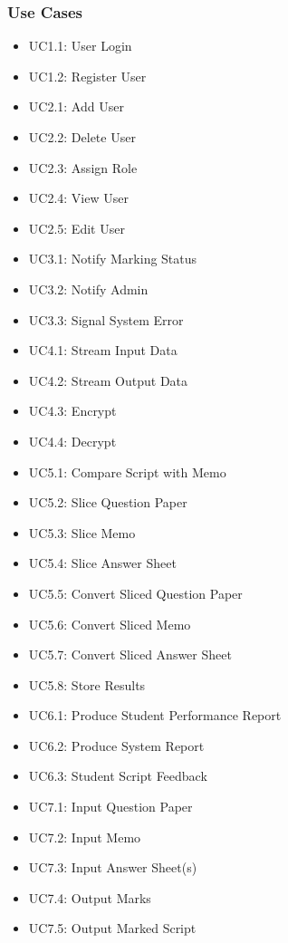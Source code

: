 \documentclass{article}
\begin{document}
	\subsubsection{Use Cases}
	\begin{itemize}
	\item UC1.1: User Login
	\item UC1.2: Register User
	\item UC2.1: Add User
	\item UC2.2: Delete User
	\item UC2.3: Assign Role
	\item UC2.4: View User
	\item UC2.5: Edit User
	\item UC3.1: Notify Marking Status
	\item UC3.2: Notify Admin
	\item UC3.3: Signal System Error
	\item UC4.1: Stream Input Data
	\item UC4.2: Stream Output Data
	\item UC4.3: Encrypt
	\item UC4.4: Decrypt
	\item UC5.1: Compare Script with Memo
	\item UC5.2: Slice Question Paper
	\item UC5.3: Slice Memo
	\item UC5.4: Slice Answer Sheet
	\item UC5.5: Convert Sliced Question Paper
	\item UC5.6: Convert Sliced Memo
	\item UC5.7: Convert Sliced Answer Sheet
	\item UC5.8: Store Results
	\item UC6.1: Produce Student Performance Report
	\item UC6.2: Produce System Report
	\item UC6.3: Student Script Feedback
	\item UC7.1: Input Question Paper
	\item UC7.2: Input Memo
	\item UC7.3: Input Answer Sheet(s)
	\item UC7.4: Output Marks
	\item UC7.5: Output Marked Script
	\end{itemize}
\end{document}
